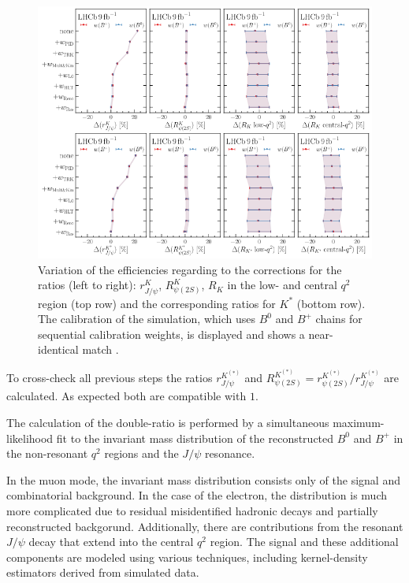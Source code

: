 \begin{figure}
    \centering
    \includegraphics[width=\linewidth]{figures/weights.png}
    \caption{Variation of the efficiencies regarding to the corrections for the ratios (left to right):
    $r^{K}_{J\!/\!\psi}$, $R^{K}_{\psi(2S)}$, $R_{K}$ in the low- and central $q^2$ region (top row) 
    and the corresponding ratios for $K^*$ (bottom row). The calibration of the simulation, which uses 
    $B^0$ and $B^+$ chains for sequential calibration weights, is displayed and shows a near-identical match 
    \cite{lhcbcollaboration2022test}.}
    \label{fig:weights}
\end{figure}
To cross-check all previous steps the ratios $r^{K^{(*)}}_{J\!/\!\psi}$ and 
${R^{K^{(*)}}_{\psi(2S)}=r^{K^{(*)}}_{\psi(2S)}/r^{K^{(*)}}_{J\!/\!\psi}}$ 
are calculated. As expected both are compatible with $\num{1}$.

The calculation of the double-ratio is performed by a simultaneous maximum-likelihood 
fit to the invariant mass distribution of the reconstructed $B^0$ and $B^+$ in the 
non-resonant $q^2$ regions and the $J\!/\!\psi$ resonance. 

In the muon mode, the invariant mass distribution consists only of the signal and 
combinatorial background. 
In the case of the electron, the distribution is much more complicated due to 
residual misidentified hadronic decays and partially reconstructed backgorund. 
Additionally, there are contributions from the resonant $J\!/\!\psi$ decay that extend 
into the central $q^2$ region. 
The signal and these additional components are modeled using various techniques, 
including kernel-density estimators derived from simulated data.

